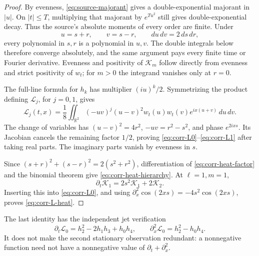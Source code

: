 \documentclass[11pt]{article}
\numberwithin{equation}{section}
\theoremstyle{definition}
\theoremstyle{remark}
\newcommand{\R}{\mathbb R}
\newcommand{\dd}{\,d}
\newcommand{\Lag}{\mathcal L}
\begin{document}
\begin{proof}
By evenness, \eqref{eq:source-majorant} gives a
double-exponential majorant in \(|u|\).  On \(|t|\le T\), multiplying
that majorant by \(e^{Tu^2}\) still gives double-exponential decay.
Thus the source's
absolute moments of every order are finite.  Under
\[
 u=s+r,\qquad v=s-r,\qquad du\,dv=2\,ds\,dr,
\]
every polynomial in \(s,r\) is a polynomial in \(u,v\).
The double integrals below therefore converge absolutely, and the
same argument pays every finite time or Fourier derivative.
Evenness and positivity of \(\mathscr K_m\) follow directly from
evenness and strict positivity of \(w_t\); for \(m>0\) the integrand
vanishes only at \(r=0\).

The full-line formula for \(h_k\) has multiplier \((iu)^k/2\).
Symmetrizing the product defining \(\Lag_j\), for \(j=0,1\), gives
\[
 \Lag_j(t,x)=\frac18\iint_{\R^2}
     (-uv)^j(u-v)^2w_t(u)w_t(v)e^{ix(u+v)}\dd u\dd v.
\]
The change of variables has \((u-v)^2=4r^2\),
\(-uv=r^2-s^2\), and phase \(e^{2ixs}\).
Its Jacobian cancels the remaining factor \(1/2\), proving
\eqref{eq:corr-L0}--\eqref{eq:corr-L1} after taking real parts.
The imaginary parts vanish by evenness in \(s\).

Since \((s+r)^2+(s-r)^2=2(s^2+r^2)\), differentiation of
\eqref{eq:corr-heat-factor} and the binomial theorem give
\eqref{eq:corr-heat-hierarchy}.  At \(\ell=1,m=1\),
\[
 \partial_t\mathscr K_1=2s^2\mathscr K_1+2\mathscr K_2.
\]
Inserting this into \eqref{eq:corr-L0}, and using
\(\partial_x^2\cos(2xs)=-4s^2\cos(2xs)\), proves
\eqref{eq:corr-L-heat}.
\end{proof}

The last identity has the independent jet verification
\[
 \partial_t\Lag_0=h_2^2-2h_1h_3+h_0h_4,\qquad
 \partial_x^2\Lag_0=h_2^2-h_0h_4.
\]
It does not make the second stationary observation redundant: a
nonnegative function need not have a nonnegative value of
\(\partial_t+\partial_x^2\).
\end{document}
